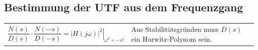 \subsection{Bestimmung der UTF aus dem Frequenzgang}
  \begin{tabular}{p{6cm}p{12cm}}
    \vspace{-1.5\topsep}
    $\dfrac{N(s)}{D(s)} \cdot \dfrac{N(-s)}{D(-s)} = \left.|H(j\omega)|^2\right|_{\omega^2=-s^2}$ &
    Aus Stabilitätsgründen muss $D(s)$ ein Hurwitz-Polynom sein.
  \end{tabular}









